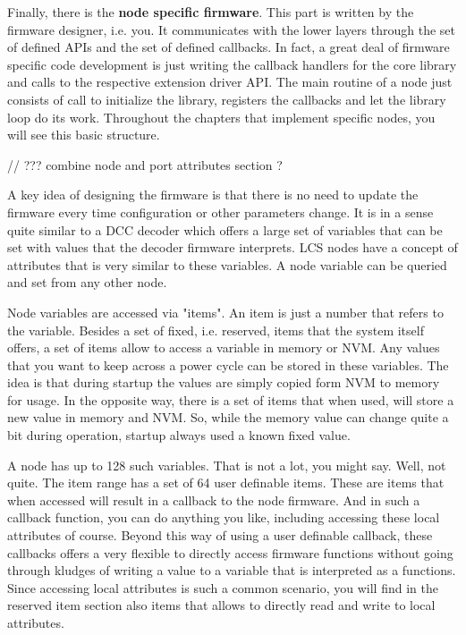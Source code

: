 Finally, there is the \textbf{node specific firmware}. This part is written by the firmware designer, i.e. you. It communicates with the lower layers through the set of defined APIs and the set of defined callbacks. In fact, a great deal of firmware specific code development is just writing the callback handlers for the core library and calls to the respective extension driver API.  The main routine of a node just consists of call to initialize the library, registers the callbacks and let the library loop do its work. Throughout the chapters that implement specific nodes, you will see this basic structure.


// ??? combine node and port attributes section ?

A key idea of designing the firmware is that there is no need to update the firmware every time configuration or other parameters change. It is in a sense quite similar to a DCC decoder which offers a large set of variables that can be set with values that the decoder firmware interprets. LCS nodes have a concept of attributes that is very similar to these variables. A node variable can be queried and set from any other node.

Node variables are accessed via "items". An item is just a number that refers to the variable. Besides a set of fixed, i.e. reserved, items that the system itself offers, a set of items allow to access a variable in memory or NVM. Any values that you want to keep across a power cycle can be stored in these variables. The idea is that during startup the values are simply copied form NVM to memory for usage. In the opposite way, there is a set of items that when used, will store a new value in memory and NVM. So, while the memory value can change quite a bit during operation, startup always used a known fixed value.

A node has up to 128 such variables. That is not a lot, you might say. Well, not quite. The item range has a set of 64 user definable items. These are items that when accessed will result in a callback to the node firmware. And in such a callback function, you can do anything you like, including accessing these local attributes of course. Beyond this way of using a user definable callback, these callbacks offers a very flexible to directly access firmware functions without going through kludges of writing a value to a variable that is interpreted as a functions. Since accessing local attributes is such a common scenario, you will find in the reserved item section also items that allows to directly read and write to local attributes.

